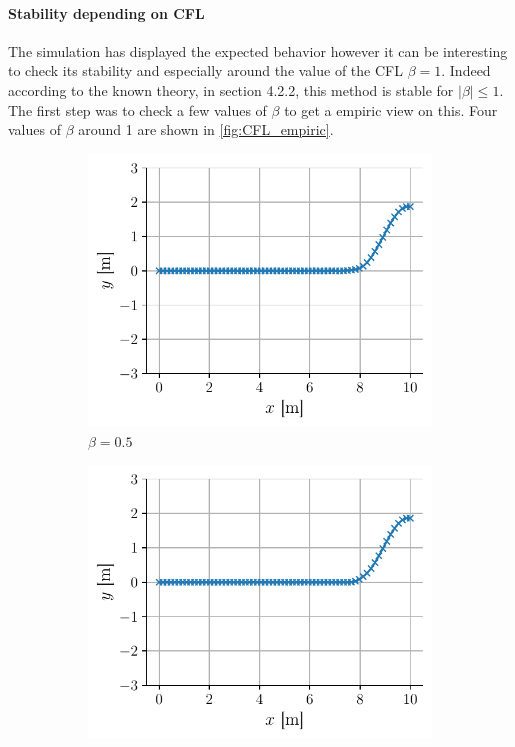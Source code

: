 \paragraph{Stability depending on CFL} The simulation has displayed the expected behavior however it can be interesting to check its stability and especially around the value of the CFL $\beta = 1$. Indeed according to the known theory, \cite{physnumbook} in section 4.2.2, this method is stable for $|\beta| \leq 1$. The first step was to check a few values of $\beta$ to get a empiric view on this. Four values of $\beta$ around 1 are shown in \autoref{fig:CFL_empiric}.
\begin{figure}[h]
    \centering
    \begin{subfigure}{0.48\linewidth}
        \includegraphics[width=\linewidth]{figures/bassin_default_CFL0.5_1.15s.pdf}
        \caption{$\beta = 0.5$}
        \label{fig:CFL_0.5}
    \end{subfigure}
    \begin{subfigure}{0.48\linewidth}
        \includegraphics[width=\linewidth]{figures/bassin_default_CFL1_1.15s.pdf}

\end{subfigure}
\end{figure}
